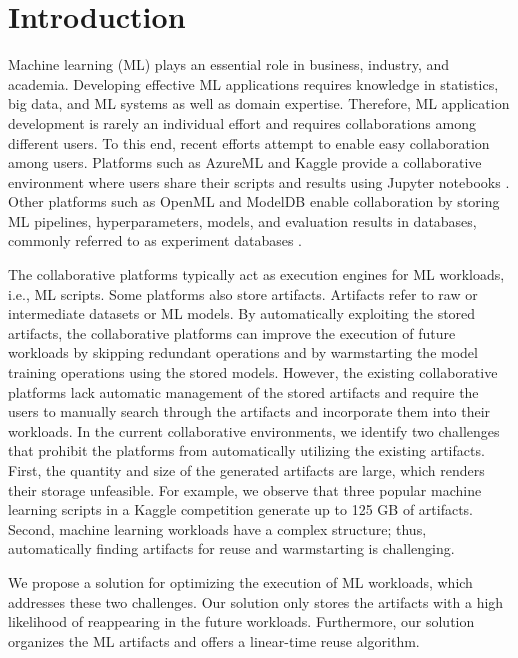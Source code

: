 \section{Introduction} \label{sec-introduction}
Machine learning (ML) plays an essential role in business, industry, and academia. 
Developing effective ML applications requires knowledge in statistics, big data, and ML systems as well as domain expertise.
Therefore, ML application development is rarely an individual effort and requires collaborations among different users.
To this end, recent efforts attempt to enable easy collaboration among users.
Platforms such as AzureML \cite{team2016azureml} and Kaggle \cite{kagglewebsite} provide a collaborative environment where users share their scripts and results using Jupyter notebooks \cite{Kluyver:2016aa}.
Other platforms such as OpenML \cite{vanschoren2014openml} and ModelDB \cite{vartak2016m} enable collaboration by storing ML pipelines, hyperparameters, models, and evaluation results in databases, commonly referred to as experiment databases \cite{Vanschoren2012}.

The collaborative platforms typically act as execution engines for ML workloads, i.e., ML scripts.
Some platforms also store artifacts.
Artifacts refer to raw or intermediate datasets or ML models.
By automatically exploiting the stored artifacts, the collaborative platforms can improve the execution of future workloads by skipping redundant operations and by warmstarting the model training operations using the stored models.
However, the existing collaborative platforms lack automatic management of the stored artifacts and require the users to manually search through the artifacts and incorporate them into their workloads.
In the current collaborative environments, we identify two challenges that prohibit the platforms from automatically utilizing the existing artifacts.
First, the quantity and size of the generated artifacts are large, which renders their storage unfeasible.
For example, we observe that three popular machine learning scripts in a Kaggle competition generate up to 125 GB of artifacts.
Second, machine learning workloads have a complex structure; thus, automatically finding artifacts for reuse and warmstarting is challenging.

We propose a solution for optimizing the execution of ML workloads, which addresses these two challenges.
Our solution only stores the artifacts with a high likelihood of reappearing in the future workloads.
Furthermore, our solution organizes the ML artifacts and offers a linear-time reuse algorithm.

